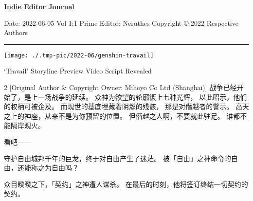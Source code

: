 \documentclass[a4paper,11pt]{article}
\begin{document}
\fboxsep=0pt

\begin{minipage}[t][6em][t]{\linewidth}
	\huge\fontsize{25pt}{25pt}\bfseries
	\center
	\vskip 5pt
		{Indie Editor Journal}\par\vfill
	\footnotesize\mdseries\sffamily
	Date: 2022-06-05 \hspace{1em} Vol 1:1 \hfill
	Prime Editor: Neruthes \hspace{1em} Copyright \copyright{} 2022 Respective Authors
\end{minipage}\par
\vskip 5pt\par
\rule{\linewidth}{1pt}\vskip 5pt

\begin{tcolorbox}[arc=0pt,colback=white,colframe=white,boxsep=0pt,boxrule=0pt,width=\textwidth,height=\textheight-9em-1.5em,top=0pt,bottom=1pt,left=0pt,right=0pt]
	\begin{minipage}[b][\textheight-9.5em][t]{31em}
		\texttt{[image: ./.tmp-pic/2022-06/genshin-travail]}\par\vfill
		\begin{minipage}{\linewidth}
			\Huge
			\bfseries
			\raggedright
			`Travail' Storyline Preview Video Script Revealed
		\end{minipage}\par
		\vfill
		\par
		\begin{multicols}{2}
			[{\small Original Author \& Copyright Owner: Mihoyo Co Ltd (Shanghai)}]
			\normalsize
			战争已经开始了，是上一场战争的延续。
			众神为欲望的轮廓镀上七种光辉，
			以此昭示，他们的权柄可被企及。
			而现世的基底埋藏着阴燃的残骸，
			那是对僭越者的警示。
			高天之上的神座，从来不是为你预留的位置。
			但僭越之人啊，不要就此驻足。
			谁都不能隔岸观火。\par
			看吧——\par
			守护自由城邦千年的巨龙，终于对自由产生了迷茫。
			被「自由」之神命令的自由，还能称之为自由吗？\par
			众目睽睽之下，「契约」之神遭人谋杀。
			在最后的时刻，他将签订终结一切契约的契约。\par

\end{multicols}
\end{minipage}
\end{tcolorbox}
\end{document}
